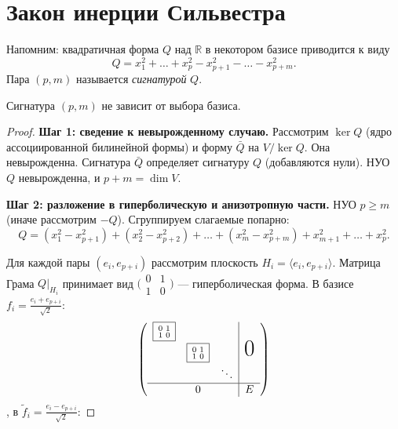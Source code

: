 \section{Закон инерции Сильвестра}

\begin{remark}
    Напомним: квадратичная форма $Q$ над $\mathbb{R}$ в некотором базисе приводится к виду
    \[
        Q = x_1^2 + \dots + x_p^2 - x_{p+1}^2 - \dots - x_{p+m}^2.
    \]
    Пара $(p, m)$ называется \emph{сигнатурой} $Q$.
\end{remark}


\begin{theorem}
    Сигнатура $(p, m)$ не зависит от выбора базиса.

    \begin{proof}
        \textbf{Шаг 1: сведение к невырожденному случаю.}
        Рассмотрим $\ker Q$ (ядро ассоциированной билинейной формы) и форму $\bar{Q}$ на $V / \ker Q$.
        Она невырожденна. Сигнатура $\bar{Q}$ определяет сигнатуру $Q$ (добавляются нули).
        НУО $Q$ невырожденна, и $p + m = \dim V$.

        \textbf{Шаг 2: разложение в гиперболическую и анизотропную части.}
        НУО $p \geq m$ (иначе рассмотрим $-Q$). Сгруппируем слагаемые попарно:
        \[
            Q = (x_1^2 - x_{p+1}^2) + (x_2^2 - x_{p+2}^2) + \dots + (x_m^2 - x_{p+m}^2) + x_{m+1}^2 + \dots + x_p^2.
        \]

        Для каждой пары $(e_i, e_{p+i})$ рассмотрим плоскость $H_i = \langle e_i, e_{p+i} \rangle$.
        Матрица Грама $Q\big|_{H_i}$ принимает вид $\bigl(\begin{smallmatrix} 0 & 1 \\ 1 & 0 \end{smallmatrix}\bigr)$ --- гиперболическая форма.
        В базисе $f_i = \frac{e_i + e_{p+i}}{\sqrt{2}}$: \\
        \[
            \left(
            \begin{array}{ccc|c}
            \fbox{$\begin{smallmatrix} 0 & 1 \\ 1 & 0 \end{smallmatrix}$} & & & \\
            & \fbox{$\begin{smallmatrix} 0 & 1 \\ 1 & 0 \end{smallmatrix}$} & & \text{\huge 0} \\
            & & \ddots & \\ \hline
            & 0 & & E
            \end{array}
            \right)
        \]
        , в $\tilde{f}_i = \frac{e_i - e_{p+i}}{\sqrt{2}}$:


\end{proof}
\end{theorem}
